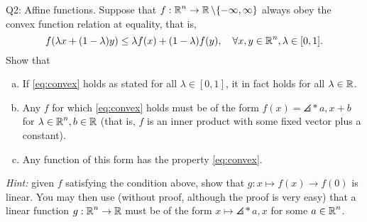 \documentclass{article}
\begin{document}
\begin{problem}
    {Q2: Affine functions.}
    Suppose that $f:\operatorname{\mathbb{R}}^n\rightarrow\operatorname{\mathbb{R}}\backslash\{-\infty,\infty\}$ always obey the convex function relation at equality, that is,
    \begin{equation}
        \label{eq:convex}
        f(\lambda x+(1-\lambda)y) \leq \lambda f(x)+(1-\lambda)f(y),\quad \forall x,y\in\operatorname{\mathbb{R}}^n,\lambda\in[0,1].
    \end{equation}
    Show that
    \begin{enumerate}[(a)]
        \item If \cref{eq:convex} holds as stated for all $\lambda\in[0,1]$, it in fact holds for all $\lambda\in\operatorname{\mathbb{R}}$.
        \item Any $f$ for which \cref{eq:convex} holds must be of the form $f(x)=\angles*{a,x}+b$ for $\lambda\in\operatorname{\mathbb{R}}^n,b\in\operatorname{\mathbb{R}}$ (that is, $f$ is an inner product with some fixed vector plus a constant).
        \item Any function of this form has the property \cref{eq:convex}.
    \end{enumerate}
    \textit{Hint:} given $f$ satisfying the condition above, show that $g:x\mapsto f(x)\rightarrow f(0)$ is linear. You may then use (without proof, although the proof is very easy) that a linear function $g: \operatorname{\mathbb{R}}^n \rightarrow \operatorname{\mathbb{R}}$ must be of the form $x \mapsto \angles*{a,x}$ for some $a \in \operatorname{\mathbb{R}}^n$.
\end{problem}
\end{document}
